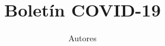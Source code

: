 \documentclass[12pt,a4paper,openany]{book}
\begin{document}
	
	\doublespacing
	
	\title{Boletín COVID-19}
	\author{Autores}
	
	\date{}

	
	
	
	\pagestyle{plain}
	
	
	\clearpage
	
	\pagestyle{plain}
	
	\clearpage
	
\end{document}
